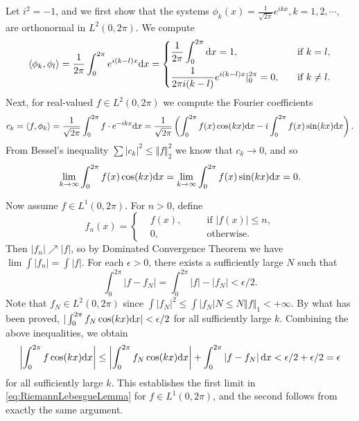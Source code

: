 \begin{exercise}{8.15}
  Let $i^2 = -1$, and we first show that the systems
  $\phi_k(x) = \frac{1}{\sqrt{2\pi}} e^{i k x}, k = 1, 2, \cdots$,
  are orthonormal in $L^2(0, 2\pi)$.
  We compute
  \[
    \left< \phi_k, \phi_l \right>
    = \frac{1}{2\pi} \int_0^{2\pi} e^{i (k-l) x} \mathrm{d} x
    = \left\{
    \begin{aligned}
      & \frac{1}{2\pi} \int_0^{2\pi} \mathrm{d} x = 1, \quad &&\text{if }k=l, \\
      & \frac{1}{2 \pi i (k-l)} e^{i (k-l) x}\vert_{0}^{2\pi} = 0,
      \quad &&\text{if }k\neq l.
    \end{aligned}
    \right.
  \]
  Next, for real-valued $f \in L^2(0, 2\pi)$
  we compute the Fourier coefficients
  \[
    c_k = \left< f, \phi_k \right>
    = \frac{1}{\sqrt{2\pi}} \int_0^{2\pi} f \cdot e^{-i k x} \mathrm{d} x
    = \frac{1}{\sqrt{2\pi}} \left(
    \int_0^{2\pi} f(x) \cos(kx) \mathrm{d} x
    - i \int_0^{2\pi} f(x) \sin(kx) \mathrm{d} x
    \right).
  \]
  From Bessel's inequality $\sum |c_k|^2 \le \Vert f \Vert_2^2$
  we know that $c_k \rightarrow 0$, and so
  \begin{equation}
    \lim_{k \rightarrow \infty} \int_0^{2\pi} f(x) \cos(kx) \mathrm{d} x
    = \lim_{k \rightarrow \infty} \int_0^{2\pi} f(x) \sin(kx) \mathrm{d} x
    = 0.
    \label{eq:RiemannLebesgueLemma}
  \end{equation}

  Now assume $f \in L^1(0, 2\pi)$.
  For $n > 0$, define
  \[
    f_n(x) = \left\{
    \begin{aligned}
      & f(x), \quad &&\text{if }\left\vert f(x) \right\vert \le n, \\
      & 0, \quad &&\text{otherwise}.
    \end{aligned}
    \right.
  \]
  Then $|f_n| \nearrow |f|$,
  so by Dominated Convergence Theorem we have $\lim \int |f_n| = \int |f|$.
  For each $\epsilon > 0$,
  there exists a sufficiently large $N$ such that
  \[
    \int_0^{2\pi} \left| f - f_N \right|
    = \int_0^{2\pi} \left| f \right| - \left| f_N \right|
    < \epsilon/2.
  \]
  Note that $f_N \in L^2(0, 2\pi)$ since
  $\int \left| f_N \right|^2 \le \int \left| f_N \right| N
  \le N \left\Vert f \right\Vert_1 < +\infty$.
  By what has been proved,
  $| \int_0^{2\pi} f_N \cos(kx) \mathrm{d} x | < \epsilon/2$
  for all sufficiently large $k$.
  Combining the above inequalities, we obtain
  \[
    \left| \int_0^{2\pi} f \cos(kx) \mathrm{d} x \right|
    \le \left| \int_0^{2\pi} f_N \cos(kx) \mathrm{d} x \right|
    + \int_0^{2\pi} \left|f - f_N\right| \mathrm{d} x
    < \epsilon/2 + \epsilon/2 = \epsilon
  \]
  for all sufficiently large $k$.
  This establishes the first limit in \eqref{eq:RiemannLebesgueLemma}
  for $f \in L^1(0, 2\pi)$,
  and the second follows from exactly the same argument.
\end{exercise}

